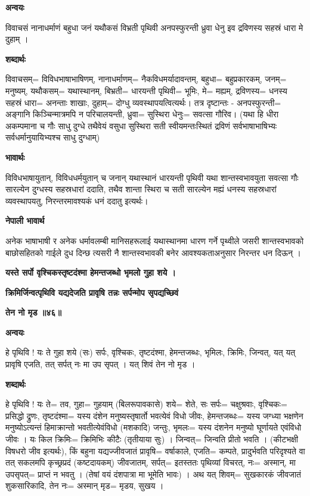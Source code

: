 \documentclass[11pt, a5paper]{article}
\begin{document}
\textbf{अन्वयः}

विवाचसं नानाधर्माणं बहुधा जनं यथौकसं विभ्रती पृथिवी अनपस्फुरन्ती ध्रुवा धेनु इव द्रविणस्य सहस्रं धारा मे दुहाम् ।

\textbf{शब्दार्थः}

विवाचसम्= विविधभाषाभाषिणम्, नानाधर्माणम्= नैकविधमर्यादावन्तम्, बहुधा= बहुप्रकारकम्, जनम्= मनुष्यम्, यथौकसम्= यथास्थानम्, बिभ्रती= धारयन्ती पृथिवी= भूमिः, मे= मह्यम्, द्रविणस्य= धनस्य सहस्रं धारा= अनन्ताः शाखाः, दुहाम्= दोग्धु व्यवस्थापयत्वित्यर्थः। तत्र दृष्टान्तः - अनपस्फुरन्ती= अङ्‍गानि किञ्चिन्मात्रमपि न परिचालयन्ती, ध्रुवा= सुस्थिरा धेनुः= सवत्सा गौरिव। (यथा हि धीरा अकम्पमाना च गौः साधु दुग्धे तथैवेयं वसुधा सुस्थिरा सती स्वीयमन्तःस्थितं द्रविणं सर्वभाषाभाषिभ्यः सर्वधर्मानुयायिभ्यश्च साधु दुग्धाम्)

\textbf{भावार्थः}

विविधभाषायुतान्, विविधधर्मयुतान् च जनान् यथास्थानं धारयन्ती पृथिवी यथा शान्तस्वभावयुता सवत्सा गौः सारल्येन दुग्धस्य सहस्रधारां ददाति, तथैव शान्ता स्थिरा च सती सारल्येन मह्यं धनस्य सहस्रधारां व्यवस्थापयतु, निरन्तरमावश्यकं धनं ददातु इत्यर्थः।

\textbf{नेपाली भावार्थ}

अनेक भाषाभाषी र अनेक धर्मावलम्बी मानिसहरूलाई यथास्थानमा धारण गर्ने पृथ्वीले जसरी शान्तस्वभावको बाछोसहितको गाईले दुध दिन्छ त्यसरी नै शान्तस्वभावकी बनेर आवश्यकताअनुसार निरन्तर धन दिऊन् ।

\textbf{यस्ते सर्पो वृश्चिकस्तृष्टदंश्मा हेमन्तजब्धो भृमलो गुहा शये ।}

\textbf{क्रिमिर्जिन्वत्पृथिवि यद्यदेजति प्रावृषि तन्नः सर्पन्मोप सृपद्यच्छिवं}

\textbf{तेन नो मृड ॥४६॥}

\textbf{अन्वयः}

हे पृथिवि ! यः ते गुहा शये (सः) सर्पः, वृश्चिकः, तृष्टदंश्मा, हेमन्तजब्धः, भृमिलः, क्रिमिः, जिन्वत्, यत् यत् प्रावृषि एजति, तत् सर्पत् नः मा उप सृपत् । यत् शिवं तेन नो मृड ।

\textbf{शब्दार्थः}

हे पृथिवि ! यः ते= तव, गुहा= गुहयाम् (बिलरूपावकासे) शये= शेते, सः सर्पः= चक्षुश्रवाः, वृश्चिकः= प्रसिद्धो द्रुणः, तृष्टदंश्मा= यस्य दंशेन मनुष्यस्तृषार्तो भवत्येवं विधो जीवः, हेमन्तजब्धः= यस्य जग्ध्या भक्षणेन मनुष्योऽत्यन्तं हिमाक्रान्तो भवतीत्येवंविधो (मशकादि) जन्तुः, भृमलः= यस्य दंशनेन मनुष्यो घूर्णायते एवंविधो जीवः । यः किल क्रिमिः= क्रिमिभिः कीटैः (तृतीयाया सुः) । जिन्वत्= जिन्वति प्रीतो भवति । (कीटभक्षी विषधरो जीव इत्यर्थः), किं बहुना यद्यज्जीवजातं प्रावृषि= वर्षाकाले, एजति= कम्पते, प्रादुर्भवति परिदृश्यते वा तत् सकलमपि कृच्छ्रप्रदं (कष्टदायकम्) जीवजातम्, सर्पत्= इतस्ततः पृथिव्यां विचरत्, नः= अस्मान्, मा उपसृपत्= प्राप्तं न भवतु । (तेषां वयं दंशपात्रा मा भूमेति भावः) । अथ यत् शिवम्= सुखकारकं जीवजातं शुकसारिकादि, तेन नः= अस्मान् मृड= मृडय, सुखय ।
\end{document}
